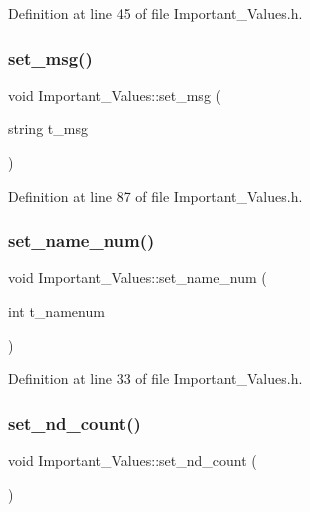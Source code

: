 Definition at line 45 of file Important\+\_\+\+Values.\+h.

\mbox{\label{class_important___values_a64c57bb070fec00295a453a54e18fb40}} 
\subsubsection{\texorpdfstring{set\_msg()}{set\_msg()}}
{\footnotesize\ttfamily void Important\+\_\+\+Values\+::set\+\_\+msg (\begin{DoxyParamCaption}\item[{string}]{t\+\_\+msg }\end{DoxyParamCaption})\hspace{0.3cm}{\ttfamily [inline]}}



Definition at line 87 of file Important\+\_\+\+Values.\+h.

\mbox{\label{class_important___values_a1f18a39c5d24a7f2d581f7d452425ef0}} 
\subsubsection{\texorpdfstring{set\_name\_num()}{set\_name\_num()}}
{\footnotesize\ttfamily void Important\+\_\+\+Values\+::set\+\_\+name\+\_\+num (\begin{DoxyParamCaption}\item[{int}]{t\+\_\+namenum }\end{DoxyParamCaption})\hspace{0.3cm}{\ttfamily [inline]}}



Definition at line 33 of file Important\+\_\+\+Values.\+h.

\mbox{\label{class_important___values_a30fac9191f1c5ff937ef30b1ec227d79}} 
\subsubsection{\texorpdfstring{set\_nd\_count()}{set\_nd\_count()}}
{\footnotesize\ttfamily void Important\+\_\+\+Values\+::set\+\_\+nd\+\_\+count (\begin{DoxyParamCaption}{ }\end{DoxyParamCaption})\hspace{0.3cm}{\ttfamily [inline]}}



